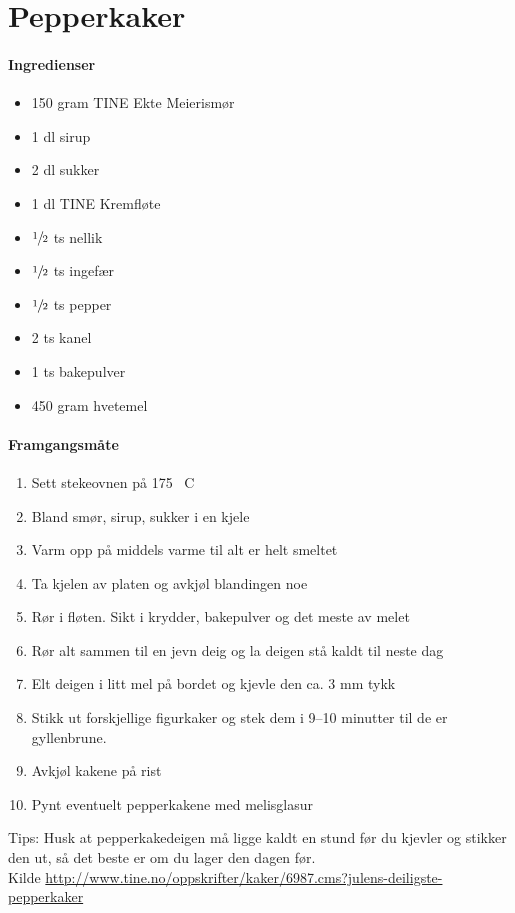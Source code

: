 \section{﻿Pepperkaker}


\paragraph{Ingredienser}
\begin{itemize}[noitemsep]
	\item 150 gram TINE Ekte Meierismør
	\item 1 dl sirup
	\item 2 dl sukker
	\item 1 dl TINE Kremfløte
	\item $\sfrac{1}{2}$ ts nellik
	\item $\sfrac{1}{2}$ ts ingefær
	\item $\sfrac{1}{2}$ ts pepper
	\item 2 ts kanel
	\item 1 ts bakepulver
	\item 450 gram hvetemel
\end{itemize}

\paragraph{Framgangsmåte}
\begin{enumerate}[noitemsep]
	\item Sett stekeovnen på 175 \degree~C
	\item Bland smør, sirup, sukker i en kjele
	\item Varm opp på middels varme til alt er helt smeltet
	\item Ta kjelen av platen og avkjøl blandingen noe
	\item Rør i fløten. Sikt i krydder, bakepulver og det meste av melet
	\item Rør alt sammen til en jevn deig og la deigen stå kaldt til neste dag
	\item Elt deigen i litt mel på bordet og kjevle den ca. 3 mm tykk
	\item Stikk ut forskjellige figurkaker og stek dem i 9--10 minutter til de er gyllenbrune.
	\item Avkjøl kakene på rist
	\item Pynt eventuelt pepperkakene med melisglasur
\end{enumerate}



Tips: Husk at pepperkakedeigen må ligge kaldt en stund før du kjevler og stikker den ut, så det beste er om du lager den dagen før.\\

Kilde \url{http://www.tine.no/oppskrifter/kaker/6987.cms?julens-deiligste-pepperkaker}
